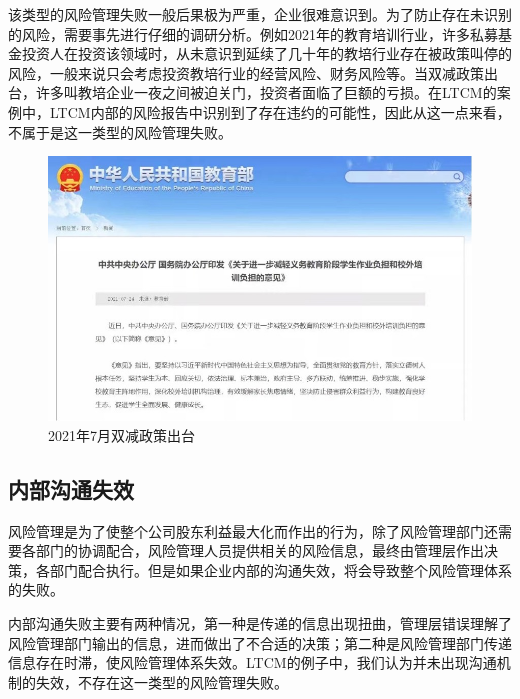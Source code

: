 该类型的风险管理失败一般后果极为严重，企业很难意识到。为了防止存在未识别的风险，需要事先进行仔细的调研分析。例如2021年的教育培训行业，许多私募基金投资人在投资该领域时，从未意识到延续了几十年的教培行业存在被政策叫停的风险，一般来说只会考虑投资教培行业的经营风险、财务风险等。当双减政策出台，许多叫教培企业一夜之间被迫关门，投资者面临了巨额的亏损。在LTCM的案例中，LTCM内部的风险报告中识别到了存在违约的可能性，因此从这一点来看，不属于是这一类型的风险管理失败。
\begin{figure}[H]
    \centering
    \includegraphics[width=\linewidth]{img/图片 1.jpg}
    \caption{2021年7月双减政策出台}
\end{figure}
\subsection{内部沟通失效}\label{sec:3}
风险管理是为了使整个公司股东利益最大化而作出的行为，除了风险管理部门还需要各部门的协调配合，风险管理人员提供相关的风险信息，最终由管理层作出决策，各部门配合执行。但是如果企业内部的沟通失效，将会导致整个风险管理体系的失败。

内部沟通失败主要有两种情况，第一种是传递的信息出现扭曲，管理层错误理解了风险管理部门输出的信息，进而做出了不合适的决策；第二种是风险管理部门传递信息存在时滞，使风险管理体系失效。LTCM的例子中，我们认为并未出现沟通机制的失效，不存在这一类型的风险管理失败。
